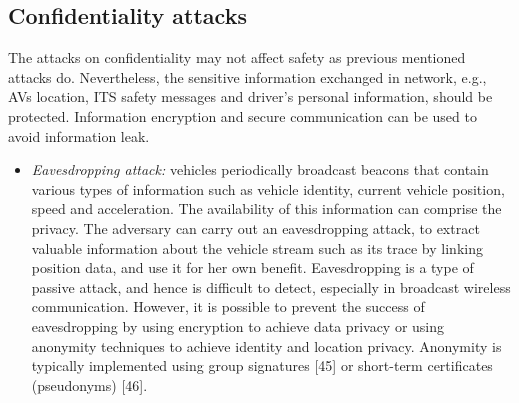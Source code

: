     \subsection{Confidentiality attacks}
    The attacks on confidentiality may not affect safety as previous mentioned attacks do. Nevertheless, the sensitive information exchanged in network, e.g., AVs location, ITS safety messages and driver's personal information, should be protected. Information encryption and secure communication can be used to avoid information leak.
    \begin{itemize}
        \item \textit{Eavesdropping attack:} vehicles periodically broadcast beacons that contain various types of information such as vehicle identity, current vehicle position, speed and acceleration. The availability of this information can comprise the privacy. The adversary can carry out an eavesdropping attack, to extract valuable information about the vehicle stream such as its trace by linking position data, and use it for her own benefit. 
        \newline
        Eavesdropping is a type of passive attack, and hence is difficult to detect, especially in broadcast wireless communication. However, it is possible to prevent the success of eavesdropping by using encryption to achieve data privacy or using anonymity techniques to achieve identity and location privacy. Anonymity is typically implemented using group signatures [45] or short-term certificates (pseudonyms) [46].
    \end{itemize}
    
